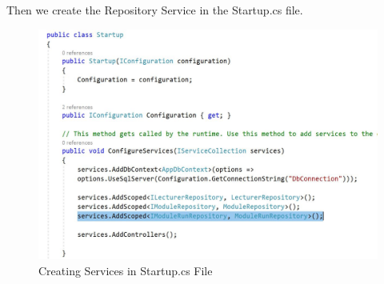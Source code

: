 \documentclass{scrartcl}
\begin{document}
\noindent                                                                %
\begin{minipage}{\linewidth}                     
\end{minipage}


\newpage

Then we create the Repository Service in the Startup.cs file.\\

\begin{figure}[h]
\centering
\includegraphics[width=150mm]{report_img/add_scoped_rep.JPG}
\caption{Creating Services in Startup.cs File}
\label{blabla}
\end{figure}

 

\cite{core3}
\end{document}
